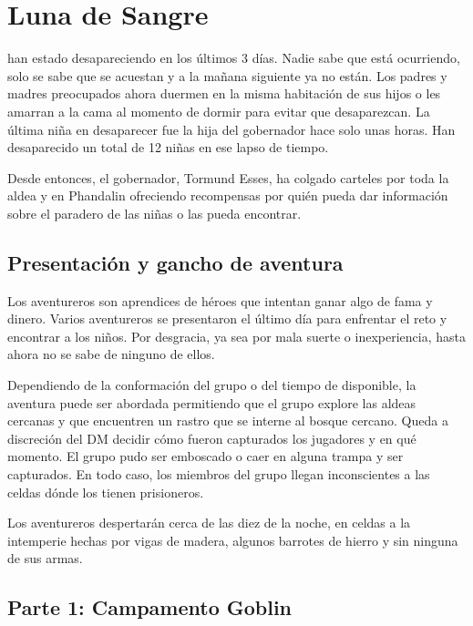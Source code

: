 \documentclass[10pt,twoside,twocolumn,openany]{dndbook}
\begin{document}
\chapter*{Luna de Sangre}

 han estado desapareciendo en los 
últimos 3 días. Nadie sabe que está ocurriendo, solo se sabe que se acuestan y a la mañana 
siguiente ya no están. Los padres y madres preocupados ahora duermen en la misma habitación de
sus hijos o les amarran a la cama al momento de dormir para evitar que desaparezcan. La última 
niña en desaparecer fue la hija del gobernador hace solo unas horas. Han desaparecido un total de 
12 niñas en ese lapso de tiempo.

Desde entonces, el gobernador, Tormund Esses, ha colgado carteles por toda la aldea y en Phandalin 
ofreciendo recompensas por quién pueda dar información sobre el paradero de las niñas o las pueda 
encontrar.

\section{Presentación y gancho de aventura}

Los aventureros son aprendices de héroes que intentan ganar algo de fama y dinero. Varios aventureros 
se presentaron el último día para enfrentar el reto y encontrar a los niños. Por desgracia, ya sea 
por mala suerte o inexperiencia, hasta ahora no se sabe de ninguno de ellos.

Dependiendo de la conformación del grupo o del tiempo de disponible, la aventura puede ser abordada
permitiendo que el grupo explore las aldeas cercanas y que encuentren un rastro que se interne al 
bosque cercano. Queda a discreción del DM decidir cómo fueron capturados los jugadores y en qué 
momento. El grupo pudo ser emboscado o caer en alguna trampa y ser capturados. En todo caso,
los miembros del grupo llegan inconscientes a las celdas dónde los tienen prisioneros.

Los aventureros despertarán cerca de las diez de la noche, en celdas a la intemperie hechas por vigas de 
madera, algunos barrotes de hierro y sin ninguna de sus armas.


\section{Parte 1: Campamento Goblin}
\end{document}
